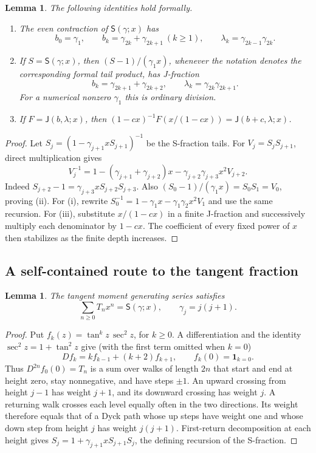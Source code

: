 \documentclass[11pt]{article}
\newtheorem{lemma}[theorem]{Lemma}
\theoremstyle{definition}
\theoremstyle{remark}
\newcommand{\Sfrac}{\mathsf S}
\newcommand{\Jfrac}{\mathsf J}
\newcommand{\ind}{\mathbf 1}
\begin{document}
\begin{lemma}\label{pou:lem:contractions}
The following identities hold formally.
\begin{enumerate}[label=(\roman*),itemsep=2pt]
\item The even contraction of $\Sfrac(\gamma;x)$ has
\[
 b_0=\gamma_1,\qquad b_k=\gamma_{2k}+\gamma_{2k+1}\ (k\ge1),
 \qquad \lambda_k=\gamma_{2k-1}\gamma_{2k}.
\]
\item If $S=\Sfrac(\gamma;x)$, then $(S-1)/(\gamma_1x)$, whenever the
notation denotes the corresponding formal tail product, has J-fraction
\[
 b_k=\gamma_{2k+1}+\gamma_{2k+2},\qquad
 \lambda_k=\gamma_{2k}\gamma_{2k+1}.
\]
For a numerical nonzero $\gamma_1$ this is ordinary division.
\item If $F=\Jfrac(b,\lambda;x)$, then
$(1-cx)^{-1}F(x/(1-cx))=\Jfrac(b+c,\lambda;x)$.
\end{enumerate}
\end{lemma}
\begin{proof}
Let $S_j=(1-\gamma_{j+1}xS_{j+1})^{-1}$ be the S-fraction tails.
For $V_j=S_jS_{j+1}$, direct multiplication gives
\[
 V_j^{-1}
 =1-(\gamma_{j+1}+\gamma_{j+2})x
   -\gamma_{j+2}\gamma_{j+3}x^2V_{j+2}.
\]
Indeed $S_{j+2}-1=\gamma_{j+3}xS_{j+2}S_{j+3}$.
Also $(S_0-1)/(\gamma_1x)=S_0S_1=V_0$, proving (ii).
For (i), rewrite
$S_0^{-1}=1-\gamma_1x-\gamma_1\gamma_2x^2V_1$ and use the same recursion.
For (iii), substitute $x/(1-cx)$ in a finite J-fraction and successively
multiply each denominator by $1-cx$.  The coefficient of every fixed power
of $x$ then stabilizes as the finite depth increases.
\end{proof}

\subsection{A self-contained route to the tangent fraction}

\begin{lemma}\label{pou:lem:tangentS}
The tangent moment generating series satisfies
\[
 \sum_{n\ge0}T_nx^n=\Sfrac(\gamma;x),\qquad \gamma_j=j(j+1).
\]
\end{lemma}
\begin{proof}
Put $f_k(z)=\tan^kz\,\sec^2z$, for $k\ge0$.
A differentiation and the identity $\sec^2z=1+\tan^2z$ give (with the
first term omitted when $k=0$)
\[
 Df_k=kf_{k-1}+(k+2)f_{k+1},\qquad f_k(0)=\ind_{k=0}.
\]
Thus $D^{2n}f_0(0)=T_n$ is a sum over walks of length $2n$ that start and
end at height zero, stay nonnegative, and have steps $\pm1$.
An upward crossing from height $j-1$ has weight $j+1$, and its downward
crossing has weight $j$.  A returning walk crosses each level equally often
in the two directions.  Its weight therefore equals that of a Dyck path
whose up steps have weight one and whose down step from height $j$ has
weight $j(j+1)$.  First-return decomposition at each height gives
$S_j=1+\gamma_{j+1}xS_{j+1}S_j$, the defining recursion of the S-fraction.
\end{proof}
\end{document}

